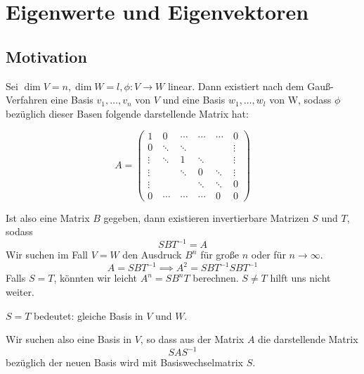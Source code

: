 \documentclass[a4paper, 10pt]{scrbook}
\begin{document}
\chapter{Eigenwerte und Eigenvektoren}

\section{Motivation}

Sei $\dim V=n, \dim W=l, \phi:V\to W$ linear.
Dann existiert nach dem Gauß-Verfahren eine Basis $v_1,\dotsc,v_n$ von $V$ und eine Basis $w_1,\dotsc,w_l$ von W, sodass
$\phi$ bezüglich dieser Basen folgende darstellende Matrix hat:

\[
 A= \begin{pmatrix}
     1 &\ 0 &\ \cdots &\ \cdots &\ \cdots &\ 0\\
     0 &\ \ddots &\ \ddots &\ &\  &\ \vdots  \\
     \vdots &\ \ddots &\ 1 &\ \ddots &\ &\ \vdots \\
     \vdots &\  &\ \ddots &\ 0 &\ \ddots &\ \vdots \\
     \vdots &\  &\  &\ \ddots &\ \ddots &\  0 \\
     0 &\ \cdots &\ \cdots &\  \cdots &\ 0 &\ 0
    \end{pmatrix}
\]


Ist also eine Matrix $B$ gegeben, dann existieren invertierbare Matrizen $S$ und $T$, sodass
\[
SBT^{-1}=A
\]
Wir suchen im Fall $V=W$ den Ausdruck $B^n$ für große $n$ oder für $n\to\infty$.
\[
A=SBT^{-1} \implies A^2=SBT^{-1}SBT^{-1}
\]
Falls $S=T$, könnten wir leicht $A^n=SB^nT$ berechnen.
$S\neq T$ hilft uns nicht weiter.

$S=T$ bedeutet: gleiche Basis in $V$ und $W$.

Wir suchen also eine Basis in $V$, so dass aus der Matrix $A$ die darstellende Matrix
\[
SAS^{-1}
\]
bezüglich der neuen Basis wird mit Basiswechselmatrix $S$.
\end{document}
